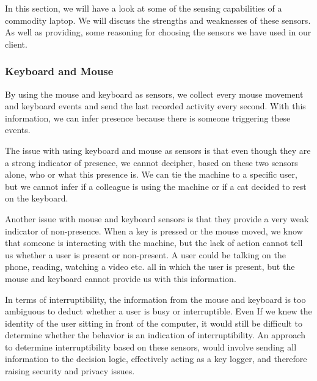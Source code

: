\documentclass{sigchi}
\begin{document}
In this section, we will have a look at some of the sensing capabilities of a commodity laptop.
We will discuss the strengths and weaknesses of these sensors.
As well as providing, some reasoning for choosing the sensors we have used in our client.

\subsubsection{Keyboard and Mouse}
By using the mouse and keyboard as sensors, we collect every mouse movement and keyboard events and send the last recorded activity every second.
With this information, we can infer presence because there is someone triggering these events.

The issue with using keyboard and mouse as sensors is that even though they are a strong indicator of presence, we cannot decipher, based on these two sensors alone, who or what this presence is.
We can tie the machine to a specific user, but we cannot infer if a colleague is using the machine or if a cat decided to rest on the keyboard.

Another issue with mouse and keyboard sensors is that they provide a very weak indicator of non-presence.
When a key is pressed or the mouse moved, we know that someone is interacting with the machine, but the lack of action cannot tell us whether a user is present or non-present.
A user could be talking on the phone, reading, watching a video etc. all in which the user is present, but the mouse and keyboard cannot provide us with this information.

In terms of interruptibility, the information from the mouse and keyboard is too ambiguous to deduct whether a user is busy or interruptible.
Even If we knew the identity of the user sitting in front of the computer, it would still be difficult to determine whether the behavior is an indication of interruptibility.
An approach to determine interruptibility based on these sensors, would involve sending all information to the decision logic, effectively acting as a key logger, and therefore raising security and privacy issues.
\end{document}
